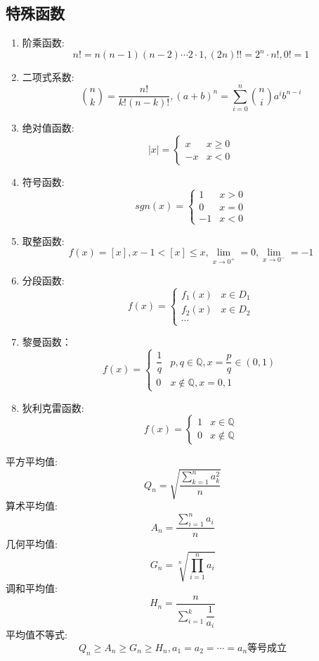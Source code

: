 \subsection{特殊函数}
\begin{definition}[特殊函数]
	\begin{enumerate}
		\item 阶乘函数: $$n!=n(n-1)(n-2)\cdots 2\cdot 1, (2n)!! = 2^{n}\cdot n!, 0! = 1$$
		\item 二项式系数: $$\binom{n}{k}=\dfrac{n!}{k!(n-k)!}, (a+b)^{n} = \sum\limits_{i = 0}^{n}\binom{n}{i}a^{i}b^{n-i}$$
		\item 绝对值函数: $$|x|=\begin{cases} x & x\geq 0 \\ -x & x<0 \end{cases}$$
		\item 符号函数: $$sgn(x)=\begin{cases} 1 & x>0 \\ 0 & x=0 \\ -1 & x<0 \end{cases}$$%
		\item 取整函数: $$f(x) = [x], x-1< [x] \leq x, \lim\limits_{x\to 0^{+}} = 0, \lim\limits_{x\to 0^{-}} =-1$$
		\item 分段函数: $$f(x)=\begin{cases} f_{1}(x) & x\in D_{1} \\ f_{2}(x) & x\in D_{2} \\ \cdots \end{cases}$$
		\item 黎曼函数：$$f(x)=\begin{cases} \dfrac{1}{q} & p,q\in \mathbb{Q}, x = \dfrac{p}{q}\in(0,1) \\ 0 & x\notin \mathbb{Q}, x=0,1 \end{cases}$$
		\item 狄利克雷函数: $$f(x)=\begin{cases} 1 & x\in \mathbb{Q} \\ 0 & x\notin \mathbb{Q} \end{cases}$$
	\end{enumerate}
\end{definition}


\begin{theorem}[平均值不等式 $a_{i} > 0$]
	平方平均值:
	$$Q_{n}=\sqrt{\dfrac{\sum\limits_{k=1}^{n}a_{k}^{2}}{n}}$$
	算术平均值:
	$$A_{n}=\dfrac{\sum\limits_{i=1}^{n}a_{i}}{n}$$
	几何平均值:
	$$G_{n}=\sqrt[n]{\prod\limits_{i=1}^{n}a_{i}}$$
	调和平均值:
	$$H_{n}=\dfrac{n}{\sum\limits_{i=1}^{k}\dfrac{1}{a_{i}}}$$
	平均值不等式:
	$$Q_{n}\geq A_{n}\geq G_{n}\geq H_{n}, a_{1} = a_{2} = \cdots = a_{n} \text{等号成立}$$
\end{theorem}


